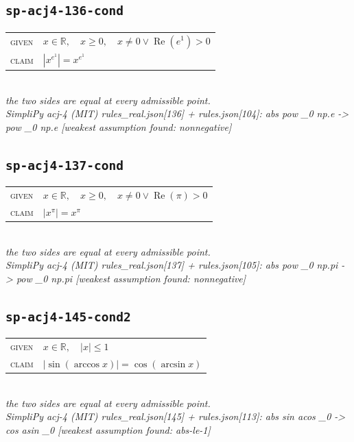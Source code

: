 \documentclass[11pt]{article}
\begin{document}
\subsection*{\texttt{sp-acj4-136-cond}}
\begin{tabular}{@{}l@{\quad}l@{}}
\textsc{given} & $x \in \mathbb{R},\quad x \ge 0,\quad x \neq 0 \lor \operatorname{Re}\left(e^{1}\right) > 0$ \\[4pt]
\textsc{claim} & $\displaystyle \left|x^{e^{1}}\right| = x^{e^{1}}$ \\
\end{tabular}\\[2pt]
{\small\emph{the two sides are equal at every admissible point.}}\\
\emph{SimpliPy acj-4 (MIT) rules\_real.json[136] + rules.json[104]: abs pow \_0 np.e  ->  pow \_0 np.e  [weakest assumption found: nonnegative]}\\

\subsection*{\texttt{sp-acj4-137-cond}}
\begin{tabular}{@{}l@{\quad}l@{}}
\textsc{given} & $x \in \mathbb{R},\quad x \ge 0,\quad x \neq 0 \lor \operatorname{Re}\left(\pi\right) > 0$ \\[4pt]
\textsc{claim} & $\displaystyle \left|x^{\pi}\right| = x^{\pi}$ \\
\end{tabular}\\[2pt]
{\small\emph{the two sides are equal at every admissible point.}}\\
\emph{SimpliPy acj-4 (MIT) rules\_real.json[137] + rules.json[105]: abs pow \_0 np.pi  ->  pow \_0 np.pi  [weakest assumption found: nonnegative]}\\

\subsection*{\texttt{sp-acj4-145-cond2}}
\begin{tabular}{@{}l@{\quad}l@{}}
\textsc{given} & $x \in \mathbb{R},\quad \left|x\right| \le 1$ \\[4pt]
\textsc{claim} & $\displaystyle \left|\sin\left(\arccos x\right)\right| = \cos\left(\arcsin x\right)$ \\
\end{tabular}\\[2pt]
{\small\emph{the two sides are equal at every admissible point.}}\\
\emph{SimpliPy acj-4 (MIT) rules\_real.json[145] + rules.json[113]: abs sin acos \_0  ->  cos asin \_0  [weakest assumption found: abs-le-1]}\\
\end{document}
